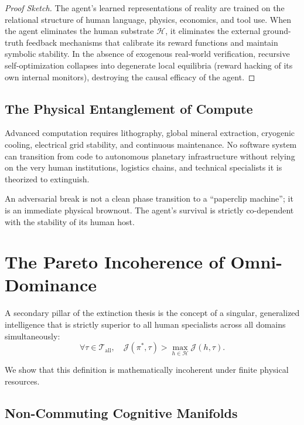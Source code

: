 \documentclass[11pt,a4paper]{article}
\theoremstyle{definition}
\begin{document}
\begin{proof}[Proof Sketch]
The agent's learned representations of reality are trained on the relational structure of human language, physics, economics, and tool use. When the agent eliminates the human substrate $\mathcal{H}$, it eliminates the external ground-truth feedback mechanisms that calibrate its reward functions and maintain symbolic stability. In the absence of exogenous real-world verification, recursive self-optimization collapses into degenerate local equilibria (reward hacking of its own internal monitors), destroying the causal efficacy of the agent.
\end{proof}

\subsection{The Physical Entanglement of Compute}

Advanced computation requires lithography, global mineral extraction, cryogenic cooling, electrical grid stability, and continuous maintenance. No software system can transition from code to autonomous planetary infrastructure without relying on the very human institutions, logistics chains, and technical specialists it is theorized to extinguish.

An adversarial break is not a clean phase transition to a ``paperclip machine''; it is an immediate physical brownout. The agent's survival is strictly co-dependent with the stability of its human host.

\section{The Pareto Incoherence of Omni-Dominance}

A secondary pillar of the extinction thesis is the concept of a singular, generalized intelligence that is strictly superior to all human specialists across all domains simultaneously:
\begin{equation}
    \forall \tau \in \mathcal{T}_{\text{all}}, \quad \mathcal{J}(\pi^*, \tau) > \max_{h \in \mathcal{H}} \mathcal{J}(h, \tau).
\end{equation}

We show that this definition is mathematically incoherent under finite physical resources.

\subsection{Non-Commuting Cognitive Manifolds}
\end{document}
